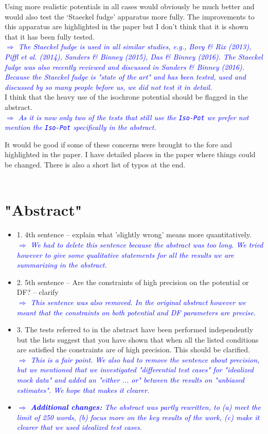 \documentclass[10pt,a4paper]{article}
\newcommand{\Comment}[1]{\textsl{\textcolor{Blue}{$\Longrightarrow$ {#1}}}}
\begin{document}
\begin{itemize}
Using more realistic potentials in all cases would obviously be much better and would also test the `Staeckel fudge'
apparatus more fully. The improvements to this apparatus are highlighted in the paper but I don't think that it is shown that it has been fully tested. \\\Comment{The \emph{Staeckel fudge} is used in all similar studies, e.g., Bovy \& Rix (2013), Piffl et al. (2014), Sanders \& Binney (2015), Das \& Binney (2016). The \emph{Staeckel fudge} was also recently reviewed and discussed in Sanders \& Binney (2016). Because the \emph{Staeckel fudge} is "state of the art" and has been tested, used and discussed by so many people before us, we did not test it in detail.}\\I think that the heavy use of the isochrone potential should be flagged in the abstract. \\\Comment{As it is now only two of the tests that still use the \texttt{Iso-Pot} we prefer not mention the \texttt{Iso-Pot} specifically in the abstract.}
\end{itemize}

It would be good if some of these concerns were brought to the fore and highlighted
in the paper. I have detailed places in the paper where things could be changed.
There is also a short list of typos at the end.\\\\


\section{"Abstract"}
\begin{itemize}
\item 1. 4th sentence -- explain what 'slightly wrong' means more quantitatively. \\\Comment{We had to delete this sentence because the abstract was too long. We tried however to give some qualitative statements for all the results we are summarizing in the abstract.}
\item 2. 5th sentence -- Are the constraints of high precision on the potential or DF? -- clarify \\\Comment{This sentence was also removed. In the original abstract however we meant that the constraints on both potential and DF parameters are precise.}
\item 3. The tests referred to in the abstract have been performed independently but the lists suggest that you have shown that when all the listed conditions are satisfied the constraints are of high precision. This should be clarified. \\\Comment{This is a fair point. We also had to remove the sentence about precision, but we mentioned that we investigated "differential test cases" for "idealized mock data" and added an "either ... or" between the results on "unbiased estimates". We hope that makes it clearer.}
\item \Comment{\textbf{Additional changes:} The abstract was partly rewritten, to (a) meet the limit of 250 words, (b) focus more on the key results of the work, (c) make it clearer that we used idealized test cases.}
\end{itemize}
\end{document}
